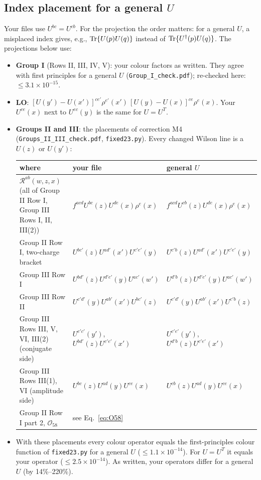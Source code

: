 \documentclass[10pt]{article}
\numberwithin{equation}{section}
\newcommand{\OO}{\mathcal O}
\begin{document}
\subsection{Index placement for a general \texorpdfstring{$U$}{U}}\label{sec:placement}
Your files use $U^{bc}=U^{cb}$. For the projection the order matters: for a general $U$, a misplaced index gives, e.g., ${\rm Tr}\{U(p)U(q)\}$ instead of ${\rm Tr}\{U^\dagger(p)U(q)\}$. The projections below use:
\begin{itemize}
\item \textbf{Group I} (Rows II, III, IV, V): your colour factors as written. They agree with first principles for a general $U$ (\texttt{Group\_I\_check.pdf}); re-checked here: $\le$$3.1\times10^{-15}$.
\item \textbf{LO}: $[U(y')-U(x')]^{ce'}\rho^{e'}(x')\,[U(y)-U(x)]^{ce}\rho^e(x)$. Your $U^{ce}(x)$ next to $U^{ec}(y)$ is the same for $U=U^T$.
\item \textbf{Groups II and III}: the placements of correction M4 (\texttt{Groups\_II\_III\_check.pdf}, \texttt{fixed23.py}). Every changed Wilson line is a $U(z)$ or $U(y')$:
\begin{center}\footnotesize
\begin{tabular}{@{}p{}ll@{}}\toprule
where & your file & general $U$\\\midrule
$\mathcal R^{ab}(w,z,x)$ (all of Group II Row I, Group III Rows I, II, III(2)) & $f^{acd}U^{bc}(z)U^{de}(x)\rho^e(x)$ & $f^{acd}U^{cb}(z)U^{de}(x)\rho^e(x)$\\
Group II Row I, two-charge bracket & $U^{bc'}(z)U^{ad'}(x')U^{c'e'}(y)$ & $U^{c'b}(z)U^{ad'}(x')U^{c'e'}(y)$\\
Group III Row I & $U^{bd'}(z)U^{d'e'}(y)U^{ac'}(w')$ & $U^{d'b}(z)U^{d'e'}(y)U^{ac'}(w')$\\
Group III Row II & $U^{c'd'}(y)U^{ab'}(x')U^{bc'}(z)$ & $U^{c'd'}(y)U^{ab'}(x')U^{c'b}(z)$\\
Group III Rows III, V, VI, III(2) (conjugate side) & $U^{e'c'}(y')$, $U^{bd'}(z)U^{c'e'}(x')$ & $U^{c'e'}(y')$, $U^{d'b}(z)U^{c'e'}(x')$\\
Group III Rows III(1), VI (amplitude side) & $U^{bc}(z)U^{ad}(y)U^{ce}(x)$ & $U^{cb}(z)U^{ad}(y)U^{ce}(x)$\\
Group II Row I part 2, $\OO_{58}$ & see Eq.~\eqref{eq:O58} & \\\bottomrule
\end{tabular}
\end{center}
\item With these placements every colour operator equals the first-principles colour function of \texttt{fixed23.py} for a general $U$ ($\le$$1.1\times10^{-14}$). For $U=U^T$ it equals your operator ($\le$$2.5\times10^{-14}$). As written, your operators differ for a general $U$ (by 14\%--220\%).
$$
\end{itemize}
\end{document}

